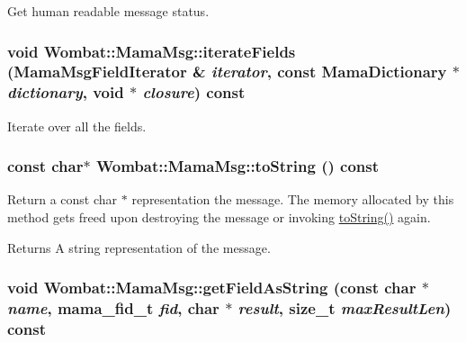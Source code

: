 Get human readable message status. \hypertarget{classWombat_1_1MamaMsg_acf7d200da9efe6ebddcd3cb4ded0be74}{
\subsubsection[{iterateFields}]{\setlength{\rightskip}{0pt plus 5cm}void Wombat::MamaMsg::iterateFields ({\bf MamaMsgFieldIterator} \& {\em iterator}, \/  const {\bf MamaDictionary} $\ast$ {\em dictionary}, \/  void $\ast$ {\em closure}) const}}
\label{classWombat_1_1MamaMsg_acf7d200da9efe6ebddcd3cb4ded0be74}


Iterate over all the fields. \hypertarget{classWombat_1_1MamaMsg_ad476d81fb9293df18f6c4509c1b3dab4}{
\subsubsection[{toString}]{\setlength{\rightskip}{0pt plus 5cm}const char$\ast$ Wombat::MamaMsg::toString () const}}
\label{classWombat_1_1MamaMsg_ad476d81fb9293df18f6c4509c1b3dab4}


Return a const char $\ast$ representation the message. The memory allocated by this method gets freed upon destroying the message or invoking \hyperlink{classWombat_1_1MamaMsg_ad476d81fb9293df18f6c4509c1b3dab4}{toString()} again.

\begin{DoxyReturn}{Returns}
A string representation of the message. 
\end{DoxyReturn}
\hypertarget{classWombat_1_1MamaMsg_a967fd4a558ed5ec369c18718e153f065}{
\subsubsection[{getFieldAsString}]{\setlength{\rightskip}{0pt plus 5cm}void Wombat::MamaMsg::getFieldAsString (const char $\ast$ {\em name}, \/  mama\_\-fid\_\-t {\em fid}, \/  char $\ast$ {\em result}, \/  size\_\-t {\em maxResultLen}) const}}
\label{classWombat_1_1MamaMsg_a967fd4a558ed5ec369c18718e153f065}


